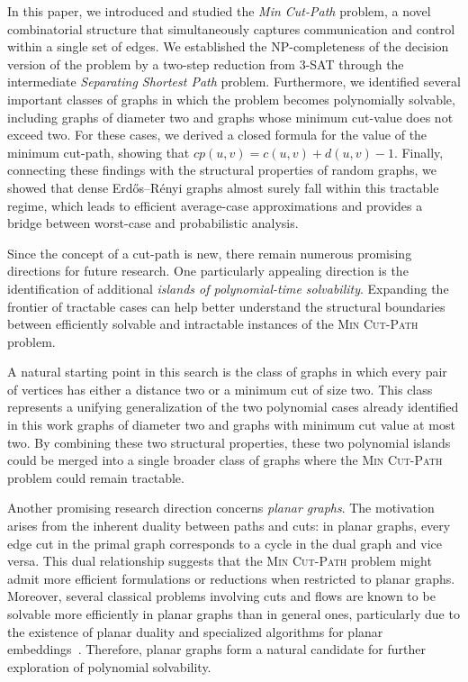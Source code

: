 \documentclass[journal ]{new-aiaa}
\numberwithin{equation}{section}
\theoremstyle{definition}
\theoremstyle{plain}
\theoremstyle{remark}
\begin{document}
In this paper, we introduced and studied the \emph{Min Cut-Path} problem, a novel combinatorial structure that simultaneously captures communication and control within a single set of edges. We established the NP-completeness of the decision version of the problem by a two-step reduction from 3-SAT through the intermediate \emph{Separating Shortest Path} problem. Furthermore, we identified several important classes of graphs in which the problem becomes polynomially solvable, including graphs of diameter two and graphs whose minimum cut-value does not exceed two. For these cases, we derived a closed formula for the value of the minimum cut-path, showing that \(cp(u, v) = c(u, v) + d(u, v) - 1.\)
Finally, connecting these findings with the structural properties of random graphs, we showed that dense Erdős–Rényi graphs almost surely fall within this tractable regime, which leads to efficient average-case approximations and provides a bridge between worst-case and probabilistic analysis.

Since the concept of a cut-path is new, there remain numerous promising directions for future research. One particularly appealing direction is the identification of additional \emph{islands of polynomial-time solvability}. Expanding the frontier of tractable cases can help better understand the structural boundaries between efficiently solvable and intractable instances of the \textsc{Min Cut-Path} problem.

A natural starting point in this search is the class of graphs in which every pair of vertices has either a distance two or a minimum cut of size two. This class represents a unifying generalization of the two polynomial cases already identified in this work graphs of diameter two and graphs with minimum cut value at most two. By combining these two structural properties, these two polynomial islands could be merged into a single broader class of graphs where the \textsc{Min Cut-Path} problem could remain tractable. 


Another promising research direction concerns \emph{planar graphs}. The motivation arises from the inherent duality between paths and cuts: in planar graphs, every edge cut in the primal graph corresponds to a cycle in the dual graph and vice versa. This dual relationship suggests that the \textsc{Min Cut-Path} problem might admit more efficient formulations or reductions when restricted to planar graphs. Moreover, several classical problems involving cuts and flows are known to be solvable more efficiently in planar graphs than in general ones, particularly due to the existence of planar duality and specialized algorithms for planar embeddings~\cite{itai1979maximum,henzinger1997faster}. Therefore, planar graphs form a natural candidate for further exploration of polynomial solvability.
\end{document}
